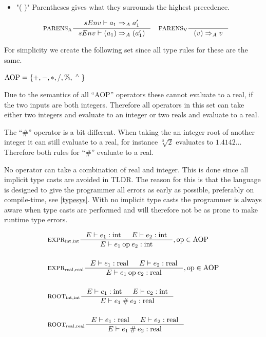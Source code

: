 \begin{itemize}
\item "( )" Parentheses gives what they surrounds the highest precedence.

\begin{align*}
&\inference[$\text{PARENS}_\text{A}$]{sEnv\vdash a_1 \Rightarrow_A a_1'}
                       {sEnv\vdash (a_1) \Rightarrow_A (a_1')}
&
&\inference[$\text{PARENS}_\text{V}$]{}
                       {(v) \Rightarrow_A v}
\end{align*}
\end{itemize}

For simplicity we create the following set since all type rules for these are the same.

\begin{center}
$\text{AOP} = \left\{ {+, -, *, /, \%, \; ^\wedge{} \;} \right\}$
\end{center}

Due to the semantics of all \enquote{AOP} operators these cannot evaluate to a real, if the two inputs are both integers. Therefore all operators in this set can take either two integers and evaluate to an integer or two reals and evaluate to a real.

The \enquote{\#} operator is a bit different. When taking the an integer root of another integer it can still evaluate to a real, for instance $\sqrt[2]{2}$ evaluates to $1.4142\dots$ Therefore both rules for \enquote{\#} evaluate to a real.

No operator can take a combination of real and integer. This is done since all implicit type casts are avoided in TLDR. The reason for this is that the language is designed to give the programmer all errors as early as possible, preferably on compile-time, see \cref{typesys}. With no implicit type casts the programmer is always aware when type casts are performed and will therefore not be as prone to make runtime type errors.

\begin{align*}
&\inference[$\text{EXPR}_{\Tint,\Tint}$]{\Tenv e_1  : \Tint & 
                       \Tenv e_2 : \Tint}
                    {\Tenv e_1 \mathbin{\text{op}} e_2 : \Tint},  \text{op} \in \Taop
\\\\
&\inference[$\text{EXPR}_{\Treal,\Treal}$]{\Tenv e_1 : \Treal & 
                       \Tenv e_2 : \Treal}
                    {\Tenv e_1 \mathbin{\text{op}} e_2 : \Treal},  \text{op} \in \Taop
\\\\
&\inference[$\text{ROOT}_{\Tint,\Tint}$]{\Tenv e_1 : \Tint &
                       \Tenv e_2 : \Tint}
                    {\Tenv e_1 \mathbin{\#} e_2 : \Treal}
\\\\
&\inference[$\text{ROOT}_{\Treal,\Treal}$]{\Tenv e_1 : \Treal &
                       \Tenv e_2 : \Treal}
                    {\Tenv e_1 \mathbin{\#} e_2 : \Treal}
\end{align*}


